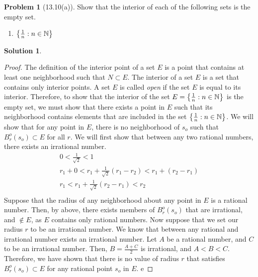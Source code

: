 \documentclass[12pt]{article}
\theoremstyle{definition} %
\newtheorem{solution}{Solution}
\newtheorem{problem}{Problem}
\theoremstyle{plain} %
\begin{document}
\begin{problem}[13.10(a)]
Show that the interior of each of the following sets is the empty set.
\begin{enumerate}
    \item $\left\{ \frac{1}{n}:n\in\mathbb{\MakeUppercase{n}}  \right\} $ 
\end{enumerate}
\end{problem}

\begin{solution}
   \item \begin{proof}
    The definition of the interior point of a set $E$ is a point that contains at least one neighborhood such that $N\subset E$. The interior of a set $E$ is a set that contains only interior points. A set $E$ is called \emph{open} if the set $E$ is equal to its interior. Therefore, to show that the interior of the set $E=\left\{ \frac{1}{n}:n\in \mathbb{\MakeUppercase{n}}  \right\} $ is the empty set, we must show that there exists a point in $E$ such that its neighborhood
    contains elements that are included in the set $\left\{ \frac{1}{n}:n\in\mathbb{\MakeUppercase{n}}  \right\}$. 
    We will show that for any point in $E$, there is no neighborhood of $s_{o} $ such that $B_{r}^{o}(s_{o} )\subset E $ for all $r$. We will first show that between any two rational numbers, there exists an irrational number.
    \begin{align}
        0<\frac{1}{\sqrt{2} }<1 \\[10pt] 
        r_{1} + 0 < r_{1} + \frac{1}{\sqrt{2} }(r_{1} -r_{2} )<r_{1} +(r_{2} -r_{1} )\\[10pt] 
        r_{1} <r_{1} +\frac{1}{\sqrt{2} }(r_{2} -r_{1} )<r_{2} \\[10pt] 
    \end{align}
    Suppose that the radius of any neighborhood about any point in $E$ is a rational number. Then, by above, there exists members of $B_{r}^{o}(s_{o} )$ that are irrational, and $\notin E $, as $E$ contains only rational numbers. Now suppose that we set our radius $r$ to be an irrational number. We know that between any rational and irrational number exists an irrational number. Let $A$  be a rational number, and $C$  to be an irrational number. Then, $B=\frac{A+C}{2}$ is irrational, and $A<B<C$. Therefore, we have shown that there is no value of radius $r$ that satisfies $B_{r}^{o}(s_{o} )\subset E$ for any rational point $s_{o} $ in $E$.  e
   \end{proof} 
\end{solution}
\end{document}
